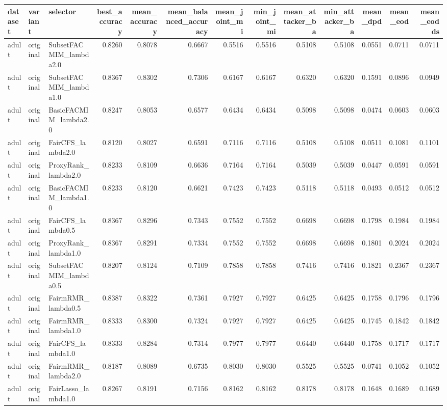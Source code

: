 \begin{tabular}{lllrrrrrrrrrr}
\toprule
dataset & variant & selector & best_accuracy & mean_accuracy & mean_balanced_accuracy & mean_joint_mi & min_joint_mi & mean_attacker_ba & min_attacker_ba & mean_dpd & mean_eod & mean_eodds \\
\midrule
adult & original & SubsetFACMIM_lambda2.0 & 0.8260 & 0.8078 & 0.6667 & 0.5516 & 0.5516 & 0.5108 & 0.5108 & 0.0551 & 0.0711 & 0.0711 \\
adult & original & SubsetFACMIM_lambda1.0 & 0.8367 & 0.8302 & 0.7306 & 0.6167 & 0.6167 & 0.6320 & 0.6320 & 0.1591 & 0.0896 & 0.0949 \\
adult & original & BasicFACMIM_lambda2.0 & 0.8247 & 0.8053 & 0.6577 & 0.6434 & 0.6434 & 0.5098 & 0.5098 & 0.0474 & 0.0603 & 0.0603 \\
adult & original & FairCFS_lambda2.0 & 0.8120 & 0.8027 & 0.6591 & 0.7116 & 0.7116 & 0.5108 & 0.5108 & 0.0511 & 0.1081 & 0.1101 \\
adult & original & ProxyRank_lambda2.0 & 0.8233 & 0.8109 & 0.6636 & 0.7164 & 0.7164 & 0.5039 & 0.5039 & 0.0447 & 0.0591 & 0.0591 \\
adult & original & BasicFACMIM_lambda1.0 & 0.8233 & 0.8120 & 0.6621 & 0.7423 & 0.7423 & 0.5118 & 0.5118 & 0.0493 & 0.0512 & 0.0512 \\
adult & original & FairCFS_lambda0.5 & 0.8367 & 0.8296 & 0.7343 & 0.7552 & 0.7552 & 0.6698 & 0.6698 & 0.1798 & 0.1984 & 0.1984 \\
adult & original & ProxyRank_lambda1.0 & 0.8367 & 0.8291 & 0.7334 & 0.7552 & 0.7552 & 0.6698 & 0.6698 & 0.1801 & 0.2024 & 0.2024 \\
adult & original & SubsetFACMIM_lambda0.5 & 0.8207 & 0.8124 & 0.7109 & 0.7858 & 0.7858 & 0.7416 & 0.7416 & 0.1821 & 0.2367 & 0.2367 \\
adult & original & FairmRMR_lambda0.5 & 0.8387 & 0.8322 & 0.7361 & 0.7927 & 0.7927 & 0.6425 & 0.6425 & 0.1758 & 0.1796 & 0.1796 \\
adult & original & FairmRMR_lambda1.0 & 0.8333 & 0.8300 & 0.7324 & 0.7927 & 0.7927 & 0.6425 & 0.6425 & 0.1745 & 0.1842 & 0.1842 \\
adult & original & FairCFS_lambda1.0 & 0.8333 & 0.8284 & 0.7314 & 0.7977 & 0.7977 & 0.6440 & 0.6440 & 0.1758 & 0.1717 & 0.1717 \\
adult & original & FairmRMR_lambda2.0 & 0.8187 & 0.8089 & 0.6735 & 0.8030 & 0.8030 & 0.5525 & 0.5525 & 0.0741 & 0.1052 & 0.1052 \\
adult & original & FairLasso_lambda1.0 & 0.8267 & 0.8191 & 0.7156 & 0.8162 & 0.8162 & 0.8178 & 0.8178 & 0.1648 & 0.1689 & 0.1689 \\

\end{tabular}
